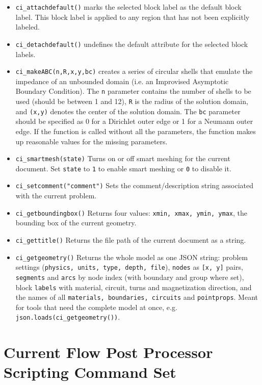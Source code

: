 \begin{itemize}
\item{\tt ci\_attachdefault()} marks the
selected block label as the default block label.  This block label
is applied to any region that has not been explicitly labeled.

\item{\tt ci\_detachdefault()} undefines the default
attribute for the selected block labels.

\item{\tt ci\_makeABC(n,R,x,y,bc)} creates a series of circular shells that emulate the
impedance of an unbounded domain (i.e. an Improvised Asymptotic Boundary
Condition).  The {\tt n} parameter contains the number of shells to be used
(should be between 1 and 12), {\tt R} is the radius of the solution domain, and
{\tt (x,y)} denotes the center of the solution domain.  The {\tt bc} parameter should
be specified as 0 for a Dirichlet outer edge or 1 for a Neumann outer edge.
If the function is called without all the parameters, the function makes up
reasonable values for the missing parameters.

\item{\tt ci\_smartmesh(state)} Turns on or off smart meshing for the current document.  Set {\tt state} to {\tt 1} to enable smart meshing or {\tt 0} to disable it.

\item{\tt ci\_setcomment("comment")} Sets the comment/description string associated with the current problem.

\item{\tt ci\_getboundingbox()} Returns four values: {\tt xmin, xmax, ymin, ymax}, the bounding box of the current geometry.

\item{\tt ci\_gettitle()} Returns the file path of the current document as a string.

\item{\tt ci\_getgeometry()} Returns the whole model as one JSON string: problem settings ({\tt physics, units, type, depth, file}), {\tt nodes} as {\tt [x, y]} pairs, {\tt segments} and {\tt arcs} by node index (with boundary and group where set), block {\tt labels} with material, circuit, turns and magnetization direction, and the names of all {\tt materials, boundaries, circuits} and {\tt pointprops}. Meant for tools that need the complete model at once, e.g. {\tt json.loads(ci\_getgeometry())}.

\end{itemize}

\section{Current Flow Post Processor Scripting Command Set}

